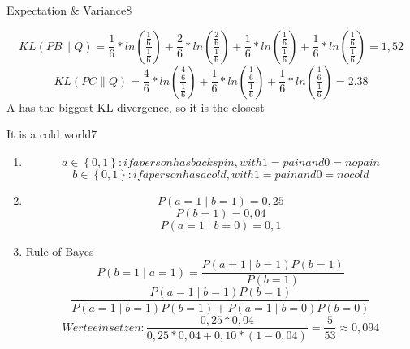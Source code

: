 \begin{questions}
\begin{question}{Expectation \& Variance}{8}
\begin{answer}
\begin{enumerate}
				\begin{equation}
		KL(PB \parallel Q) = \frac{ 1 }{ 6 } * ln (\frac{ \frac{ 1 }{6  } }{ \frac{ 1 }{ 6 } }) + \frac{ 2 }{ 6 } * ln (\frac{ \frac{ 2 }{6  } }{ \frac{ 1 }{ 6 } }) + \frac{ 1 }{ 6 } * ln (\frac{ \frac{ 1 }{6  } }{ \frac{ 1 }{ 6 } }) + \frac{ 1 }{ 6 } * ln (\frac{ \frac{ 1 }{6  } }{ \frac{ 1 }{ 6 } }) = 1,52
		\end{equation}
				\begin{equation}
		KL(PC\parallel Q) = \frac{ 4 }{ 6 } * ln (\frac{ \frac{ 4 }{6  } }{ \frac{ 1 }{ 6 } }) + \frac{ 1 }{ 6 } * ln (\frac{ \frac{ 1 }{6  } }{ \frac{ 1 }{ 6 } }) + \frac{ 1 }{ 6 } * ln (\frac{ \frac{ 1 }{6  } }{ \frac{ 1 }{ 6 } })  = 2.38
		\end{equation}
		A has the biggest KL divergence, so it is the closest
		\end{enumerate}
	\end{answer}
	\end{question}
	
	
	\begin{question}{It is a cold world}{7}		
	\begin{answer} 
	\begin{enumerate}
		\item 
			\begin{equation}
			a \in\left\{ 0, 1 \right\}: if a person has backspin, with 1 = pain and 0 = no pain
			\end{equation}
			\begin{equation}
			b \in\left\{ 0, 1 \right\}: if a person has a cold, with 1 = pain and 0 = no cold
			\end{equation}
		\item \begin{equation}
		P(a = 1 \mid b = 1) = 0,25
		\end{equation}
		\begin{equation}
		P( b = 1) = 0,04
		\end{equation}
		\begin{equation}
		P(a = 1 \mid b = 0) = 0,1
		\end{equation}
		\item Rule of Bayes
		\begin{equation}
		P(b = 1 \mid a = 1) =  \frac{ P(a = 1 \mid b = 1) P(b = 1) }{ P(b = 1)  }
		\end{equation}
				\begin{equation}
				\frac{ P(a = 1 \mid b = 1) P(b = 1) }{ P (a = 1 \mid b = 1) P (b = 1) + P(a = 1 \mid b = 0) P(b = 0 ) }
		\end{equation}
				\begin{equation}
				Werte einsetzen: \frac{ 0,25 * 0,04 }{0,25 * 0,04 + 0,10 * (1 - 0,04)  } = \frac{ 5 }{ 53 } \approx 0,094
		\end{equation}
		

\end{enumerate}
\end{answer}
\end{question}
\end{questions}
